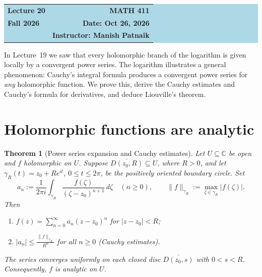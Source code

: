 \documentclass[11pt]{article}
\theoremstyle{plain}
\newtheorem{theorem}{Theorem}[section]
\theoremstyle{definition}
\theoremstyle{remark}
\numberwithin{equation}{section}
\newcommand{\C}{\mathbb{C}}
\begin{document}
\begin{center}
  \colorbox{lightblue}{%
    \begin{minipage}{0.94\textwidth}
      \vspace{0.55em}
      \begin{tabular*}{\textwidth}{@{\extracolsep{\fill}}lr}
        {\color{courseblue}\bfseries\LARGE Lecture 20} &
        {\color{courseblue}\bfseries\LARGE MATH 411}\\[0.35em]
        \textbf{Fall 2026} & \textbf{Date: Oct 26, 2026}\\
        & \textbf{Instructor: Manish Patnaik}
      \end{tabular*}
      \vspace{0.45em}
    \end{minipage}}
\end{center}

\setcounter{tocdepth}{1}
\tableofcontents
\vspace{0.45em}

In Lecture~19 we saw that every holomorphic branch of the logarithm is
given locally by a convergent power series. The logarithm illustrates a
general phenomenon: Cauchy's integral formula produces a convergent power
series for \emph{any} holomorphic function. We prove this, derive the
Cauchy estimates and Cauchy's formula for derivatives, and deduce
Liouville's theorem.

\section{Holomorphic functions are analytic}
\begin{theorem}[Power series expansion and Cauchy estimates]\label{thm:analytic}
Let $U\subseteq\C$ be open and $f$ holomorphic on $U$. Suppose
$\overline{D(z_0,R)}\subseteq U$, where $R>0$, and let
$\gamma_R(t)=z_0+Re^{it}$, $0\leq t\leq2\pi$, be the positively
oriented boundary circle. Set
\[
 a_n:=\frac{1}{2\pi i}\int_{\gamma_R}
       \frac{f(\zeta)}{(\zeta-z_0)^{n+1}}\,d\zeta
 \quad(n\geq0),\qquad
 \|f\|_{\gamma_R}:=\max_{\zeta\in\gamma_R}|f(\zeta)|.
\]
Then
\begin{enumerate}
 \item $\displaystyle f(z)=\sum_{n=0}^{\infty}a_n(z-z_0)^n$
       for $|z-z_0|<R$;
 \item $\displaystyle |a_n|\leq\frac{\|f\|_{\gamma_R}}{R^n}$ for all $n\geq0$
       \quad\emph{(Cauchy estimates)}.
\end{enumerate}
The series converges uniformly on each closed disc
$\overline{D(z_0,s)}$ with $0<s<R$. Consequently, $f$ is analytic on $U$.
\end{theorem}
\end{document}
